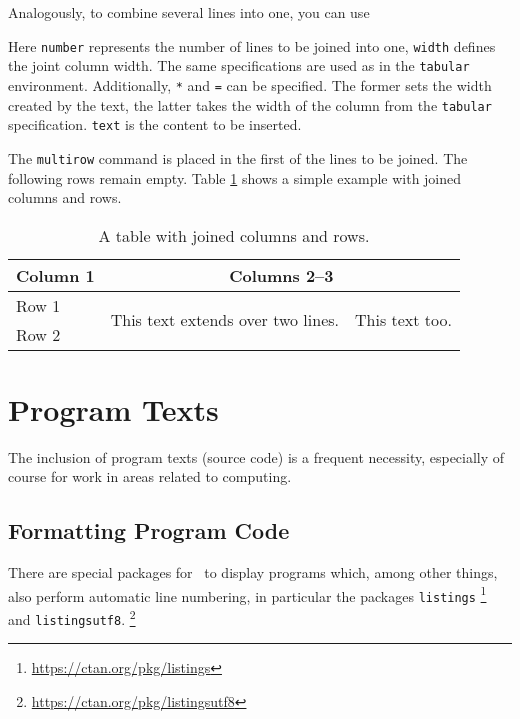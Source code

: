 Analogously, to combine several lines into one, you can use
%
\begin{GenericCode}[numbers=none]
\end{GenericCode}
%
Here \texttt{number} represents the number of lines to be joined into one,
\texttt{width} defines the joint column width. The same specifications are
used as in the \texttt{tabular} environment. Additionally, \texttt{*} and
\texttt{=} can be specified. The former sets the width created by the text,
the latter takes the width of the column from the \texttt{tabular}
specification. \texttt{text} is the content to be inserted.

The \verb|multirow| command is placed in the first of the lines to be joined.
The following rows remain empty. Table \ref{tab:multi-column-row-table} shows
a simple example with joined columns and rows.


\begin{table}[htbp]
    \caption{A table with joined columns and rows.}
    \label{tab:multi-column-row-table}
    \centering
    \setlength{\tabcolsep}{10pt} %
    \renewcommand{\arraystretch}{1.25}      %
    \begin{tabular}{@{}lll@{}}
        \toprule
        Column 1 & \multicolumn{2}{c}{Columns 2--3} \\
        \midrule
        Row 1 &
        \multirow{2}{4cm}{This text extends over two lines.} &
        \multirow{2}{*}{This text too.} \\
        Row 2 & & \\
        \bottomrule
    \end{tabular}
\end{table}


\section{Program Texts}
\label{sec:program-texts}

The inclusion of program texts (source code) is a frequent necessity,
especially of course for work in areas related to computing.

\subsection{Formatting Program Code}
\label{sec:FormattingProgramCode}

There are special packages for \latex\ to display programs which, among other
things, also perform automatic line numbering, in particular the packages
\texttt{listings}%
\footnote{\url{https://ctan.org/pkg/listings}}
and \texttt{listingsutf8}.%
\footnote{\url{https://ctan.org/pkg/listingsutf8}}

